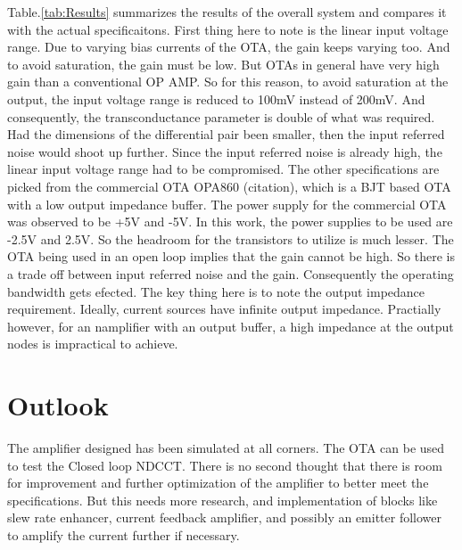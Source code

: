 Table.\ref{tab:Results} summarizes the results of the overall system and compares it with the actual specificaitons. First thing here to note is the linear input voltage range. Due to varying bias currents of the OTA, the gain keeps varying too. And to avoid saturation, the gain must be low. But OTAs in general have very high gain than a conventional OP AMP. So for this reason, to avoid saturation at the output, the input voltage range is reduced to 100mV instead of 200mV. And consequently, the transconductance parameter is double of what was required. Had the dimensions of the differential pair been smaller, then the input referred noise would shoot up further. Since the input referred noise is already high, the linear input voltage range had to be compromised. The other specifications are picked from the commercial OTA OPA860 (citation), which is a BJT based OTA with a low output impedance buffer. The power supply for the commercial OTA was observed to be +5V and -5V. In this work, the power supplies to be used are -2.5V and 2.5V. So the headroom for the transistors to utilize is much lesser. The OTA being used in an open loop implies that the gain cannot be high.  So there is a trade off  between input referred noise and the gain. Consequently the operating bandwidth gets efected. The key thing here is to note the output impedance requirement. Ideally, current sources have infinite output impedance. Practially however, for an namplifier with an output buffer, a high impedance at the output nodes is impractical to achieve.

\section{Outlook}

The amplifier designed has been simulated at all corners. The OTA can be used to test the Closed loop NDCCT. There is no second thought that there is room for improvement and further optimization of the amplifier to better meet the specifications. But this needs more research, and implementation of blocks like slew rate enhancer, current feedback amplifier, and possibly an emitter follower to amplify the current further if necessary.